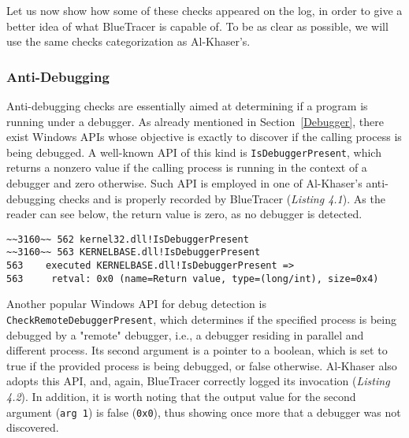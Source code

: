 Let us now show how some of these checks appeared on the log, in order to give a better idea of what BlueTracer is capable of. To be as clear as possible, we will use the same checks categorization as Al-Khaser's.

\subsubsection*{Anti-Debugging}

Anti-debugging checks are essentially aimed at determining if a program is running under a debugger. As already mentioned in Section~\ref{Debugger}, there exist Windows APIs whose objective is exactly to discover if the calling process is being debugged.
A well-known API of this kind is \texttt{IsDebuggerPresent}, which returns a nonzero value if the calling process is running in the context of a debugger and zero otherwise. Such API is employed in one of Al-Khaser's anti-debugging checks and is properly recorded by BlueTracer (\textit{Listing 4.1}). As the reader can see below, the return value is zero, as no debugger is detected.

\vspace{0.5cm}
\begin{lstlisting}[caption={Log entry relative to \texttt{IsDebuggerPresent}},captionpos=b]
~~3160~~ 562 kernel32.dll!IsDebuggerPresent
~~3160~~ 563 KERNELBASE.dll!IsDebuggerPresent
563    executed KERNELBASE.dll!IsDebuggerPresent =>
563 	retval: 0x0 (name=Return value, type=(long/int), size=0x4)
\end{lstlisting}

Another popular Windows API for debug detection is \texttt{CheckRemoteDebuggerPresent}, which determines if the specified process is being debugged by a "remote" debugger, i.e., a debugger residing in parallel and different process.
Its second argument is a pointer to a boolean, which is set to true if the provided process is being debugged, or false otherwise. Al-Khaser also adopts this API, and, again, BlueTracer correctly logged its invocation (\textit{Listing 4.2}). In addition, it is worth noting that the output value for the second argument (\texttt{arg 1}) is 
false (\texttt{0x0}), thus showing once more that a debugger was not discovered.

